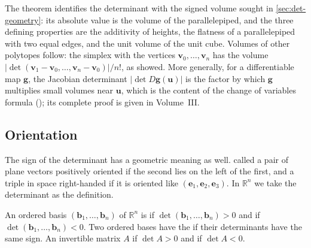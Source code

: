 The theorem identifies the determinant with the signed volume sought in \cref{sec:det-geometry}: its absolute value is the volume of the parallelepiped, and the three defining properties are the additivity of heights, the flatness of a parallelepiped with two equal edges, and the unit volume of the unit cube. Volumes of other polytopes follow: the simplex with the vertices $\mathbf v_0,\ldots,\mathbf v_n$ has the volume $|\det(\mathbf v_1-\mathbf v_0,\ldots,\mathbf v_n-\mathbf v_0)|/n!$, as  showed. More generally, for a differentiable map $\mathbf g$, the Jacobian determinant $|\det D\mathbf g(\mathbf u)|$ is the factor by which $\mathbf g$ multiplies small volumes near $\mathbf u$, which is the content of the change of variables formula (); its complete proof is given in Volume~III.

\subsection{Orientation}

The sign of the determinant has a geometric meaning as well.  called a pair of plane vectors positively oriented if the second lies on the left of the first, and a triple in space right-handed if it is oriented like $(\mathbf e_1,\mathbf e_2,\mathbf e_3)$. In $\mathbb R^n$ we take the determinant as the definition.

\begin{definition}[Orientation]
\label{def:orientation}
An ordered basis $(\mathbf b_1,\ldots,\mathbf b_n)$ of $\mathbb R^n$ is  if $\det(\mathbf b_1,\ldots,\mathbf b_n)>0$ and  if $\det(\mathbf b_1,\ldots,\mathbf b_n)<0$. Two ordered bases have the  if their determinants have the same sign. An invertible matrix $A$  if $\det A>0$ and  if $\det A<0$.
\end{definition}

